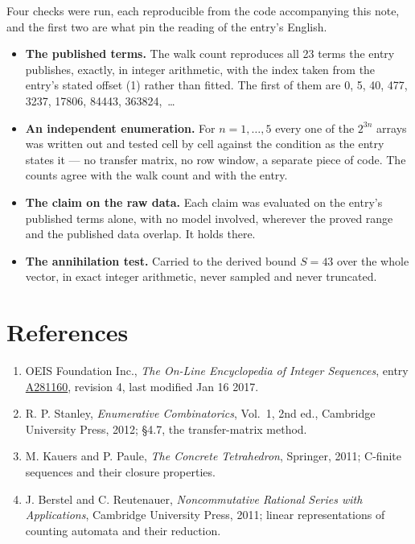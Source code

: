 \documentclass[11pt]{article}
\theoremstyle{definition}
\begin{document}
Four checks were run, each reproducible from the code accompanying this note, and the first two are what pin the reading of the entry's English.

\begin{itemize}

\item {\bfseries The published terms.} The walk count reproduces all 23 terms the entry publishes, exactly, in integer arithmetic, with the index taken from the entry's stated offset (1) rather than fitted. The first of them are 0, 5, 40, 477, 3237, 17806, 84443, 363824,~\dots

\item {\bfseries An independent enumeration.} For $n = 1,\dots,5$ every one of the $2^{3n}$ arrays was written out and tested cell by cell against the condition as the entry states it --- no transfer matrix, no row window, a separate piece of code. The counts agree with the walk count and with the entry.

\item {\bfseries The claim on the raw data.} Each claim was evaluated on the entry's published terms alone, with no model involved, wherever the proved range and the published data overlap. It holds there.

\item {\bfseries The annihilation test.} Carried to the derived bound $S = 43$ over the whole vector, in exact integer arithmetic, never sampled and never truncated.

\end{itemize}

\section{References}

\begin{enumerate}

\item OEIS Foundation Inc., \emph{The On-Line Encyclopedia of Integer Sequences}, entry \href{https://oeis.org/A281160}{A281160}, revision 4, last modified Jan 16 2017.

\item R. P. Stanley, \emph{Enumerative Combinatorics}, Vol.~1, 2nd ed., Cambridge University Press, 2012; \S4.7, the transfer-matrix method.

\item M. Kauers and P. Paule, \emph{The Concrete Tetrahedron}, Springer, 2011; C-finite sequences and their closure properties.

\item J. Berstel and C. Reutenauer, \emph{Noncommutative Rational Series with Applications}, Cambridge University Press, 2011; linear representations of counting automata and their reduction.

\end{enumerate}
\end{document}
